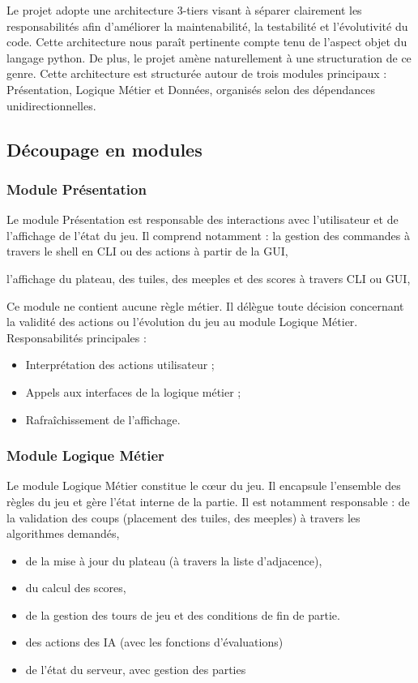 \documentclass[a4paper]{article}
\begin{document}
Le projet adopte une architecture 3-tiers visant à séparer clairement les responsabilités afin d’améliorer la maintenabilité, la testabilité et l’évolutivité du code.
Cette architecture nous paraît pertinente compte tenu de l’aspect objet du langage python. De plus, le projet amène naturellement à une structuration de ce genre.
Cette architecture est structurée autour de trois modules principaux : Présentation, Logique Métier et Données, organisés selon des dépendances unidirectionnelles.

\subsection{Découpage en modules}

\subsubsection{Module Présentation}

Le module Présentation est responsable des interactions avec l’utilisateur et de l’affichage de l’état du jeu.
Il comprend notamment :
la gestion des commandes à travers le shell en CLI ou des actions à partir de la GUI,


l’affichage du plateau, des tuiles, des meeples et des scores à travers CLI ou GUI,


Ce module ne contient aucune règle métier.
Il délègue toute décision concernant la validité des actions ou l’évolution du jeu au module Logique Métier.
Responsabilités principales :

\begin{itemize}
  \item Interprétation des actions utilisateur ;
  \item Appels aux interfaces de la logique métier ;
  \item Rafraîchissement de l’affichage.

\end{itemize}


\subsubsection{Module Logique Métier}
Le module Logique Métier constitue le cœur du jeu.
Il encapsule l’ensemble des règles du jeu et gère l’état interne de la partie.
Il est notamment responsable :
de la validation des coups (placement des tuiles, des meeples) à travers les algorithmes demandés,

\begin{itemize}
  \item de la mise à jour du plateau (à travers la liste d’adjacence),
  \item du calcul des scores,
  \item de la gestion des tours de jeu et des conditions de fin de partie.  
  \item des actions des IA (avec les fonctions d’évaluations)
  \item de l’état du serveur, avec gestion des parties
\end{itemize}
\end{document}
